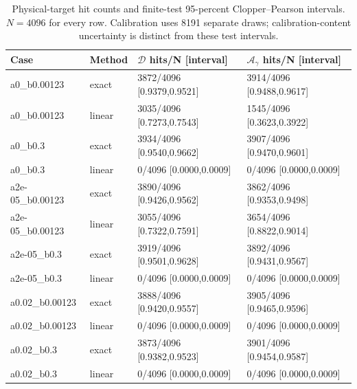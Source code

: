 \documentclass[aps,prd,reprint,onecolumn,nofootinbib]{revtex4-2}
\begin{document}
\begin{table}[htbp]
\centering\small
\caption{Physical-target hit counts and finite-test 95-percent Clopper--Pearson intervals. $N=4096$ for every row. Calibration uses 8191 separate draws; calibration-content uncertainty is distinct from these test intervals.}\label{tab:radcoverage}
\begin{tabular}{llll}
\toprule
Case & Method & $\mathscr D$ hits/N [interval] & $\mathcal A_\gamma$ hits/N [interval] \\
\midrule
a0\_b0.00123 & exact & 3872/4096 [0.9379,0.9521] & 3914/4096 [0.9488,0.9617] \\
a0\_b0.00123 & linear & 3035/4096 [0.7273,0.7543] & 1545/4096 [0.3623,0.3922] \\
a0\_b0.3 & exact & 3934/4096 [0.9540,0.9662] & 3907/4096 [0.9470,0.9601] \\
a0\_b0.3 & linear & 0/4096 [0.0000,0.0009] & 0/4096 [0.0000,0.0009] \\
a2e-05\_b0.00123 & exact & 3890/4096 [0.9426,0.9562] & 3862/4096 [0.9353,0.9498] \\
a2e-05\_b0.00123 & linear & 3055/4096 [0.7322,0.7591] & 3654/4096 [0.8822,0.9014] \\
a2e-05\_b0.3 & exact & 3919/4096 [0.9501,0.9628] & 3892/4096 [0.9431,0.9567] \\
a2e-05\_b0.3 & linear & 0/4096 [0.0000,0.0009] & 0/4096 [0.0000,0.0009] \\
a0.02\_b0.00123 & exact & 3888/4096 [0.9420,0.9557] & 3905/4096 [0.9465,0.9596] \\
a0.02\_b0.00123 & linear & 0/4096 [0.0000,0.0009] & 0/4096 [0.0000,0.0009] \\
a0.02\_b0.3 & exact & 3873/4096 [0.9382,0.9523] & 3901/4096 [0.9454,0.9587] \\
a0.02\_b0.3 & linear & 0/4096 [0.0000,0.0009] & 0/4096 [0.0000,0.0009] \\
\bottomrule
\end{tabular}
\end{table}
\end{document}
